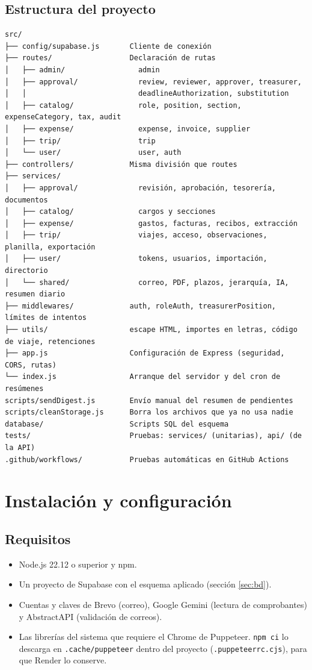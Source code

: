 \documentclass[11pt,letterpaper]{article}
\newcommand{\code}[1]{\nolinkurl{#1}}
\begin{document}
\subsection{Estructura del proyecto}

\begin{lstlisting}
src/
├── config/supabase.js       Cliente de conexión
├── routes/                  Declaración de rutas
│   ├── admin/                 admin
│   ├── approval/              review, reviewer, approver, treasurer,
│   │                          deadlineAuthorization, substitution
│   ├── catalog/               role, position, section, expenseCategory, tax, audit
│   ├── expense/               expense, invoice, supplier
│   ├── trip/                  trip
│   └── user/                  user, auth
├── controllers/             Misma división que routes
├── services/
│   ├── approval/              revisión, aprobación, tesorería, documentos
│   ├── catalog/               cargos y secciones
│   ├── expense/               gastos, facturas, recibos, extracción
│   ├── trip/                  viajes, acceso, observaciones, planilla, exportación
│   ├── user/                  tokens, usuarios, importación, directorio
│   └── shared/                correo, PDF, plazos, jerarquía, IA, resumen diario
├── middlewares/             auth, roleAuth, treasurerPosition, límites de intentos
├── utils/                   escape HTML, importes en letras, código de viaje, retenciones
├── app.js                   Configuración de Express (seguridad, CORS, rutas)
└── index.js                 Arranque del servidor y del cron de resúmenes
scripts/sendDigest.js        Envío manual del resumen de pendientes
scripts/cleanStorage.js      Borra los archivos que ya no usa nadie
database/                    Scripts SQL del esquema
tests/                       Pruebas: services/ (unitarias), api/ (de la API)
.github/workflows/           Pruebas automáticas en GitHub Actions
\end{lstlisting}

\section{Instalación y configuración}

\subsection{Requisitos}
\begin{itemize}
  \item Node.js 22.12 o superior y npm.
  \item Un proyecto de Supabase con el esquema aplicado (sección \ref{sec:bd}).
  \item Cuentas y claves de Brevo (correo), Google Gemini (lectura de comprobantes) y AbstractAPI (validación de correos).
  \item Las librerías del sistema que requiere el Chrome de Puppeteer. \code{npm ci} lo descarga en \code{.cache/puppeteer} dentro del proyecto (\code{.puppeteerrc.cjs}), para que Render lo conserve.
\end{itemize}
\end{document}
